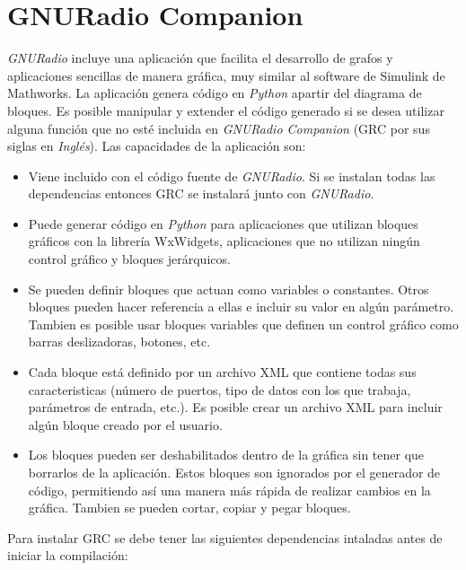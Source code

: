 
\chapter{GNURadio Companion}
\label{AppB}

\emph{GNURadio} incluye una aplicaci\'on que facilita el desarrollo de grafos y aplicaciones
sencillas de manera gr\'afica, muy similar al software de Simulink de Mathworks. La aplicaci\'on
genera c\'odigo en \emph{Python} apartir del diagrama de bloques. Es posible manipular y
extender el c\'odigo generado si se desea utilizar alguna funci\'on que no est\'e incluida en
\emph{GNURadio Companion}\cite{grc} (GRC por sus siglas en \emph{Ingl\'es}). Las capacidades de la
aplicaci\'on son:

\begin{itemize}
  \item Viene incluido con el c\'odigo fuente de \emph{GNURadio}. Si se instalan todas las dependencias
  entonces GRC se instalar\'a junto con \emph{GNURadio}.
  \item Puede generar c\'odigo en \emph{Python} para aplicaciones que utilizan bloques gr\'aficos con la
  librer\'ia WxWidgets, aplicaciones que no utilizan ning\'un control gr\'afico y bloques jer\'arquicos.
  \item Se pueden definir bloques que actuan como variables o constantes. Otros bloques pueden hacer
  referencia a ellas e incluir su valor en alg\'un par\'ametro. Tambien es posible usar bloques
  variables que definen un control gr\'afico como barras deslizadoras, botones, etc.
  \item Cada bloque est\'a definido por un archivo XML que contiene todas sus caracteristicas (n\'umero
  de puertos, tipo de datos con los que trabaja, par\'ametros de entrada, etc.). Es posible crear un
  archivo XML para incluir alg\'un bloque creado por el usuario.
  \item Los bloques pueden ser deshabilitados dentro de la gr\'afica sin tener que borrarlos de la
  aplicaci\'on. Estos bloques son ignorados por el generador de c\'odigo, permitiendo as\'i una manera
  m\'as r\'apida de realizar cambios en la gr\'afica. Tambien se pueden cortar, copiar y pegar bloques.
\end{itemize}

Para instalar GRC se debe tener las siguientes dependencias intaladas antes de iniciar la
compilaci\'on:

